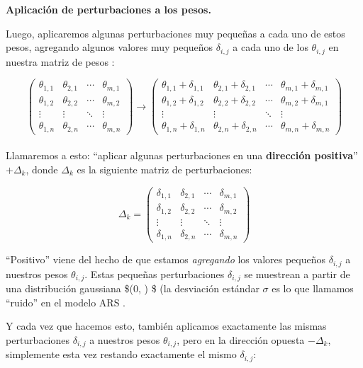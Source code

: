 \documentclass[
]{book}
\begin{document}
\textbf{Aplicación de perturbaciones a los pesos.}

Luego, aplicaremos algunas perturbaciones muy pequeñas a cada uno de estos pesos, agregando algunos valores muy pequeños \(\delta_{i, j}\) a cada uno de los \(\theta_{i, j}\) en nuestra matriz de pesos :

\[
\begin{pmatrix}
\theta_{1,1} & \theta_{2,1} & \cdots & \theta_{m,1} \\
\theta_{1,2} & \theta_{2,2} & \cdots & \theta_{m,2} \\
\vdots & \vdots & \ddots & \vdots \\
\theta_{1,n} & \theta_{2,n} & \cdots & \theta_{m,n}
\end{pmatrix}
\longrightarrow
\begin{pmatrix}
\theta_{1,1} + \delta_{1,1} & \theta_{2,1} + \delta_{2,1} & \cdots & \theta_{m,1} + \delta_{m,1} \\
\theta_{1,2} + \delta_{1,2} & \theta_{2,2} + \delta_{2,2} & \cdots & \theta_{m,2} + \delta_{m,1} \\
\vdots & \vdots & \ddots & \vdots \\
\theta_{1,n} + \delta_{1,n} & \theta_{2,n} + \delta_{2,n} & \cdots & \theta_{m,n} + \delta_{m,n}
\end{pmatrix}
\]\\

Llamaremos a esto: ``aplicar algunas perturbaciones en una \textbf{dirección positiva}'' \(+\Delta_k\), donde \(\Delta_k\) es la siguiente matriz de perturbaciones:

\[
\Delta_k
=
\begin{pmatrix}
\delta_{1,1} & \delta_{2,1} & \cdots & \delta_{m,1} \\
\delta_{1,2} & \delta_{2,2} & \cdots & \delta_{m,2} \\
\vdots & \vdots & \ddots & \vdots \\
\delta_{1,n} & \delta_{2,n} & \cdots & \delta_{m,n}
\end{pmatrix}
\]

``Positivo'' viene del hecho de que estamos \emph{agregando} los valores pequeños \(\delta_{i, j}\) a nuestros pesos \(\theta_{i, j}\). Estas pequeñas perturbaciones \(\delta_{i, j}\) se muestrean a partir de una distribución gaussiana \$(0, \sigma) \$ (la desviación estándar \(\sigma\) es lo que llamamos ``ruido'' en el modelo ARS .

Y cada vez que hacemos esto, también aplicamos exactamente las mismas perturbaciones \(\delta_{i, j}\) a nuestros pesos \(\theta_{i, j}\), pero en la dirección opuesta \(-\Delta_k\), simplemente esta vez restando exactamente el mismo \(\delta_{i, j}\):
\end{document}
